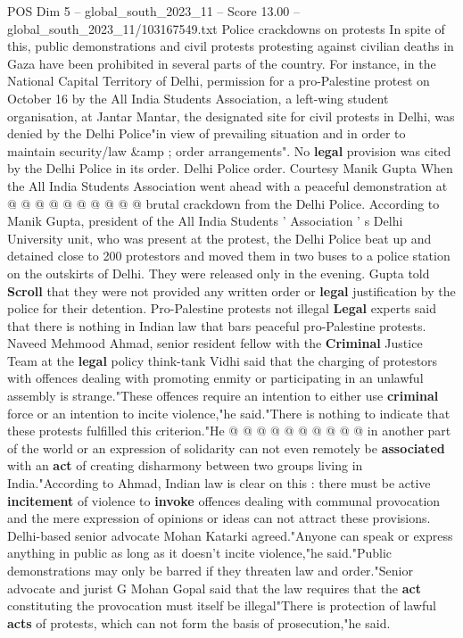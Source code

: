 \begin{textsample}{POS Dim 5 – global\_south\_2023\_11 – Score 13.00 – global\_south\_2023\_11/103167549.txt}
Police crackdowns on protests In spite of this, public demonstrations and civil protests protesting against civilian deaths in Gaza have been prohibited in several parts of the country.
For instance, in the National Capital Territory of Delhi, permission for a pro-Palestine protest on October 16 by the All India Students Association, a left-wing student organisation, at Jantar Mantar, the designated site for civil protests in Delhi, was denied by the Delhi Police"in view of prevailing situation and in order to maintain security/law \&amp ; order arrangements".
No \textbf{legal} provision was cited by the Delhi Police in its order.
Delhi Police order.
Courtesy Manik Gupta When the All India Students Association went ahead with a peaceful demonstration at @ @ @ @ @ @ @ @ @ @ brutal crackdown from the Delhi Police.
According to Manik Gupta, president of the All India Students ' Association ' s Delhi University unit, who was present at the protest, the Delhi Police beat up and detained close to 200 protestors and moved them in two buses to a police station on the outskirts of Delhi.
They were released only in the evening.
Gupta told \textbf{Scroll} that they were not provided any written order or \textbf{legal} justification by the police for their detention.
Pro-Palestine protests not illegal \textbf{Legal} experts said that there is nothing in Indian law that bars peaceful pro-Palestine protests.
Naveed Mehmood Ahmad, senior resident fellow with the \textbf{Criminal} Justice Team at the \textbf{legal} policy think-tank Vidhi said that the charging of protestors with offences dealing with promoting enmity or participating in an unlawful assembly is strange."These offences require an intention to either use \textbf{criminal} force or an intention to incite violence,"he said."There is nothing to indicate that these protests fulfilled this criterion."He @ @ @ @ @ @ @ @ @ @ in another part of the world or an expression of solidarity can not even remotely be \textbf{associated} with an \textbf{act} of creating disharmony between two groups living in India."According to Ahmad, Indian law is clear on this : there must be active \textbf{incitement} of violence to \textbf{invoke} offences dealing with communal provocation and the mere expression of opinions or ideas can not attract these provisions.
Delhi-based senior advocate Mohan Katarki agreed."Anyone can speak or express anything in public as long as it doesn't incite violence,"he said."Public demonstrations may only be barred if they threaten law and order."Senior advocate and jurist G Mohan Gopal said that the law requires that the \textbf{act} constituting the provocation must itself be illegal"There is protection of lawful \textbf{acts} of protests, which can not form the basis of prosecution,"he said.

\end{textsample}
